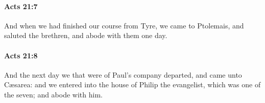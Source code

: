 		\paragraph{Acts 21:7} %
			\label{ACTS-21-7}

			And when we had finished our course from Tyre, we came to Ptolemais, and saluted the brethren, and abode with them one day.

			\begin{framed}
			\scriptsize
				\begin{compactdesc}
					\item[SBLG] 
				\end{compactdesc}
			\end{framed}

		\paragraph{Acts 21:8} %
			\label{ACTS-21-8}

			And the next day we that were of Paul's company departed, and came unto Cæsarea: and we entered into the house of Philip the evangelist, which was one of the seven; and abode with him.

